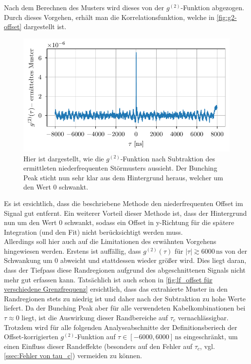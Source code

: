 Nach dem Berechnen des Musters wird dieses von der $g^{(2)}$-Funktion abgezogen. 
Durch dieses Vorgehen, erhält man die Korrelationsfunktion, welche in \autoref{fig:g2-offset} dargestellt ist.
\begin{figure}[h]
    \centering
    \includegraphics{images/Analysis/g2-lf_offset.pdf}
    \caption{Hier ist dargestellt, wie die $g^{(2)}$-Funktion nach Subtraktion des ermittleten niederfrequenten Störmusters aussieht. Der Bunching Peak sticht nun sehr klar aus dem Hintergrund heraus, welcher um den Wert 0 schwankt.}
    \label{fig:g2-offset}
\end{figure}
Es ist ersichtlich, dass die beschriebene Methode den niederfrequenten Offset im Signal gut entfernt. 
Ein weiterer Vorteil dieser Methode ist, dass der Hintergrund nun um den Wert 0 schwankt, sodass ein Offset in y-Richtung für die spätere Integration (und den Fit) nicht berücksichtigt werden muss. \\
Allerdings soll hier auch auf die Limitationen des erwähnten Vorgehens hingewiesen werden. 
Erstens ist auffällig, dass $g^{(2)}(\tau)$ für $|\tau|\gtrsim 6000\,\mathrm{ns}$ von der Schwankung um 0 abweicht und stattdessen wieder größer wird. 
Dies liegt daran, dass der Tiefpass diese Randregionen aufgrund des abgeschnittenen Signals nicht mehr gut erfassen kann. 
Tatsächlich ist auch schon in \autoref{fig:lf_offset für verschiedene Grenzfrequenz} ersichtlich, dass das extrahierte Muster in den Randregionen stets zu niedrig ist und daher nach der Subtraktion zu hohe Werte liefert. 
Da der Bunching Peak aber für alle verwendeten Kabelkombinationen bei $\tau\approx 0$ liegt, ist die Auswirkung dieser Randbereiche auf $\tau_c$ vernachlässigbar. 
Trotzdem wird für alle folgenden Analyseabschnitte der Definitionsberiech der Offset-korrigierten $g^{(2)}$-Funktion auf $\tau\in[-6000,6000]\,\mathrm{ns}$ eingeschränkt, um einen Einfluss dieser Randeffekte (besonders auf den Fehler auf $\tau_c$, vgl. \autoref{ssec:Fehler von tau_c}) vermeiden zu können. 
